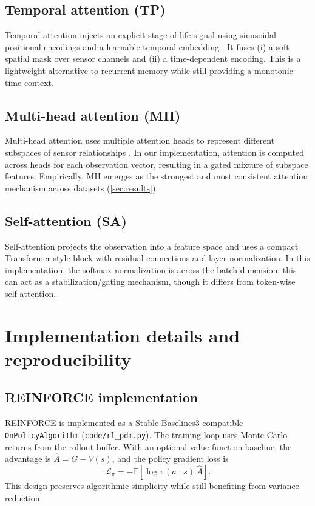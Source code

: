\documentclass[11pt]{article}
\begin{document}
\subsection{Temporal attention (TP)}
Temporal attention injects an explicit stage-of-life signal using sinusoidal positional encodings and a learnable temporal embedding \parencite{Vaswani2017Attention}. It fuses (i) a soft spatial mask over sensor channels and (ii) a time-dependent encoding. This is a lightweight alternative to recurrent memory while still providing a monotonic time context.

\subsection{Multi-head attention (MH)}
Multi-head attention uses multiple attention heads to represent different subspaces of sensor relationships \parencite{Vaswani2017Attention}. In our implementation, attention is computed across heads for each observation vector, resulting in a gated mixture of subspace features. Empirically, MH emerges as the strongest and most consistent attention mechanism across datasets (\cref{sec:results}).

\subsection{Self-attention (SA)}
Self-attention projects the observation into a feature space and uses a compact Transformer-style block with residual connections and layer normalization. In this implementation, the softmax normalization is across the batch dimension; this can act as a stabilization/gating mechanism, though it differs from token-wise self-attention.

\section{Implementation details and reproducibility}
\label{sec:implementation}
\subsection{REINFORCE implementation}
\label{sec:reinforce_impl}
REINFORCE is implemented as a Stable-Baselines3 compatible \texttt{OnPolicyAlgorithm} (\texttt{code/rl\_pdm.py}). The training loop uses Monte-Carlo returns from the rollout buffer. With an optional value-function baseline, the advantage is $\hat{A}=G-V(s)$, and the policy gradient loss is
\begin{equation}
	\mathcal{L}_{\pi} = -\mathbb{E}[\log\pi(a\mid s)\,\hat{A}].
\end{equation}
This design preserves algorithmic simplicity while still benefiting from variance reduction.
\end{document}
